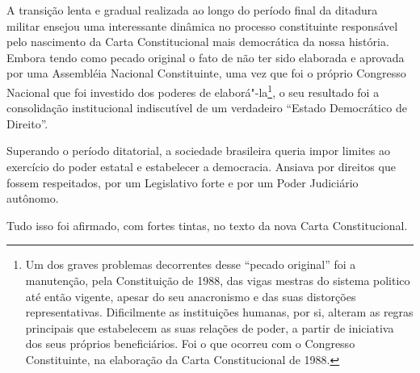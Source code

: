A transição lenta e gradual realizada ao longo do período final da
ditadura militar ensejou uma interessante dinâmica no processo
constituinte responsável pelo nascimento da Carta Constitucional mais
democrática da nossa história. Embora tendo como pecado original o fato
de não ter sido elaborada e aprovada por uma Assembléia Nacional
Constituinte, uma vez que foi o próprio Congresso Nacional que foi
investido dos poderes de elaborá"-la\footnote{Um dos graves problemas
  decorrentes desse ``pecado original'' foi a manutenção, pela
  Constituição de 1988, das vigas mestras do sistema politico até então
  vigente, apesar do seu anacronismo e das suas distorções
  representativas. Dificilmente as instituições humanas, por si, alteram
  as regras principais que estabelecem as suas relações de poder, a
  partir de iniciativa dos seus próprios beneficiários. Foi o que
  ocorreu com o Congresso Constituinte, na elaboração da Carta
  Constitucional de 1988.}, o seu resultado foi a consolidação
institucional indiscutível de um verdadeiro ``Estado Democrático
de Direito''.

Superando o período ditatorial, a sociedade brasileira queria impor
limites ao exercício do poder estatal e estabelecer a democracia.
Ansiava por direitos que fossem respeitados, por um Legislativo forte e
por um Poder Judiciário autônomo.

Tudo isso foi afirmado, com fortes tintas, no texto da nova Carta
Constitucional.

